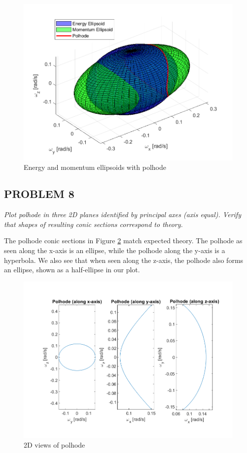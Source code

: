 \begin{figure}[H]
\centering
\includegraphics[scale=0.65]{Images/ps2_problem7.png}
\caption{Energy and momentum ellipsoids with polhode}
\label{fig:ps2_problem7}
\end{figure}

\subsection{PROBLEM 8}
\textit{Plot polhode in three 2D planes identified by principal axes (axis equal). Verify that shapes of resulting conic sections correspond to theory.}

The polhode conic sections in Figure \ref{fig:ps2_problem8} match expected theory. The polhode as seen along the x-axis is an ellipse, while the polhode along the y-axis is a hyperbola. We also see that when seen along the z-axis, the polhode also forms an ellipse, shown as a half-ellipse in our plot.

\begin{figure}[H]
\centering
\includegraphics[scale=0.7]{Images/ps2_problem8.png}
\caption{2D views of polhode}
\label{fig:ps2_problem8}
\end{figure}


